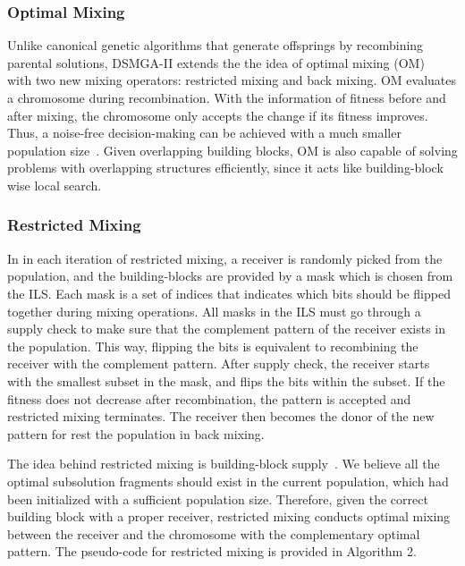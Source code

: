 \documentclass{sig-alternate-05-2015}
\begin{document}
\subsubsection{Optimal Mixing}
Unlike canonical genetic algorithms that generate offsprings by recombining parental solutions, DSMGA-II extends the the idea of optimal mixing (OM)~\cite{thierens:OM} with two new mixing operators: restricted mixing and back mixing. OM evaluates a chromosome during recombination. With the information of fitness before and after mixing, the chromosome only accepts the change if its fitness improves. Thus, a noise-free decision-making can be achieved with a much smaller population size~\cite{goldberg:buildingblock}. Given overlapping building blocks, OM is also capable of solving problems with overlapping structures efficiently, since it acts like building-block wise local search.


\subsubsection{Restricted Mixing}

In in each iteration of restricted mixing, a receiver is randomly picked from the population, and the building-blocks are provided by a mask which is chosen from the ILS. Each mask is a set of indices that indicates which bits should be flipped together during mixing operations. All masks in the ILS must go through a supply check to make sure that the complement pattern of the receiver exists in the population. This way, flipping the bits is equivalent to recombining the receiver with the complement pattern. After supply check, the receiver starts with the smallest subset in the mask, and flips the bits within the subset. If the fitness does not decrease after recombination, the pattern is accepted and restricted mixing terminates. The receiver then becomes the donor of the new pattern for rest the population in back mixing. 


The idea behind restricted mixing is building-block supply~\cite{goldberg:buildingblock}. We believe all the optimal subsolution fragments should exist in the current population, which had been initialized with a sufficient population size. Therefore, given the correct building block with a proper receiver, restricted mixing conducts optimal mixing between the receiver and the chromosome with the complementary optimal pattern. The pseudo-code for  restricted mixing is provided in Algorithm 2.
\end{document}
